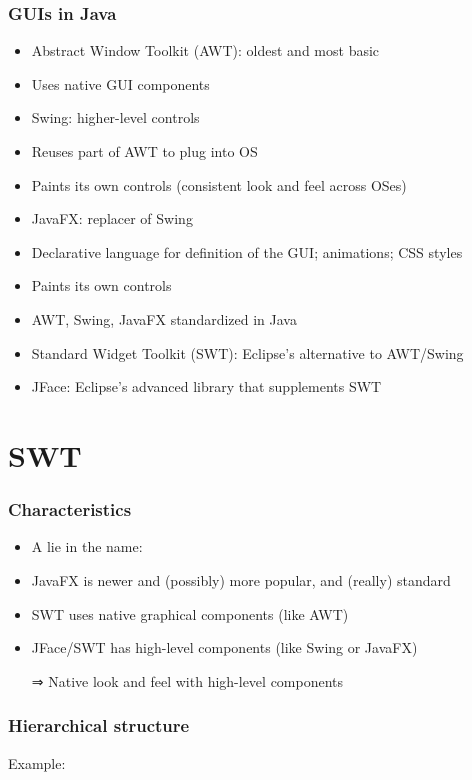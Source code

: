 \documentclass[french, english]{beamer}
\begin{document}
\begin{frame}
	\frametitle{GUIs in Java}
	\begin{itemize}
		\item Abstract Window Toolkit (AWT): oldest and most basic
		\item Uses native GUI components
		\item Swing: higher-level controls
		\item Reuses part of AWT to plug into OS
		\item Paints its own controls (consistent look and feel across OSes)
		\item JavaFX: replacer of Swing
		\item Declarative language for definition of the GUI; animations; CSS styles
		\item Paints its own controls
		\item AWT, Swing, JavaFX standardized in Java
		\item Standard Widget Toolkit (SWT): Eclipse’s alternative to AWT/Swing
		\item JFace: Eclipse’s advanced library that supplements SWT
	\end{itemize}
\end{frame}

\section{SWT}
\begin{frame}
	\frametitle{Characteristics}
	\begin{itemize}
		\item A lie in the name: \onslide<2>{it’s not standard!}
		\item JavaFX is newer and (possibly) more popular, and (really) standard
		\item SWT uses native graphical components (like AWT)
		\item JFace/SWT has high-level components (like Swing or JavaFX)
		\item[⇒] Native look and feel with high-level components
	\end{itemize}
\end{frame}

\begin{frame}[fragile]
	\frametitle{Hierarchical structure}
	Example:
	\footnotesize
\end{frame}
\end{document}

